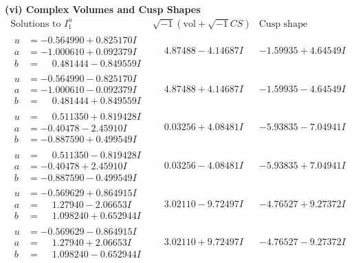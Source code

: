 \documentclass[1p]{elsarticle_modified}
\theoremstyle{definition}
\newcommand{\I}{\sqrt{-1}}
\begin{document}
\newpage\flushleft \textbf{(vi) Complex Volumes and Cusp Shapes}
$$\begin{array}{c|c|c}  
\text{Solutions to }I^u_{1}& \I (\text{vol} + \sqrt{-1}CS) & \text{Cusp shape}\\
 \hline 
\begin{aligned}
u &= -0.564990 + 0.825170 I \\
a &= -1.000610 + 0.092379 I \\
b &= \phantom{-}0.481444 - 0.849559 I\end{aligned}
 & \phantom{-}4.87488 - 4.14687 I & -1.59935 + 4.64549 I \\ \hline\begin{aligned}
u &= -0.564990 - 0.825170 I \\
a &= -1.000610 - 0.092379 I \\
b &= \phantom{-}0.481444 + 0.849559 I\end{aligned}
 & \phantom{-}4.87488 + 4.14687 I & -1.59935 - 4.64549 I \\ \hline\begin{aligned}
u &= \phantom{-}0.511350 + 0.819428 I \\
a &= -0.40478 - 2.45910 I \\
b &= -0.887590 + 0.499549 I\end{aligned}
 & \phantom{-}0.03256 + 4.08481 I & -5.93835 - 7.04941 I \\ \hline\begin{aligned}
u &= \phantom{-}0.511350 - 0.819428 I \\
a &= -0.40478 + 2.45910 I \\
b &= -0.887590 - 0.499549 I\end{aligned}
 & \phantom{-}0.03256 - 4.08481 I & -5.93835 + 7.04941 I \\ \hline\begin{aligned}
u &= -0.569629 + 0.864915 I \\
a &= \phantom{-}1.27940 - 2.06653 I \\
b &= \phantom{-}1.098240 + 0.652944 I\end{aligned}
 & \phantom{-}3.02110 - 9.72497 I & -4.76527 + 9.27372 I \\ \hline\begin{aligned}
u &= -0.569629 - 0.864915 I \\
a &= \phantom{-}1.27940 + 2.06653 I \\
b &= \phantom{-}1.098240 - 0.652944 I\end{aligned}
 & \phantom{-}3.02110 + 9.72497 I & -4.76527 - 9.27372 I \\ \hline\begin{aligned}

\end{aligned}
\end{array}$$
\end{document}
